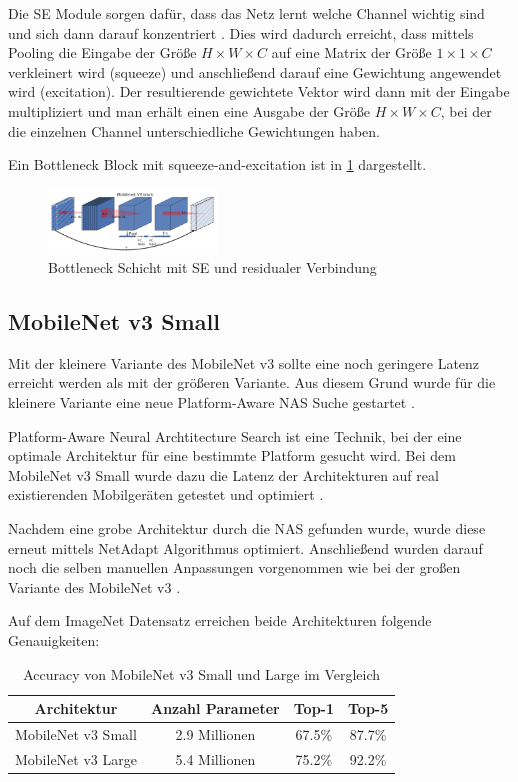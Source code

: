 \documentclass[conference]{IEEEtran}
\begin{document}
Die SE Module sorgen dafür, dass das Netz lernt welche Channel wichtig sind und sich dann darauf konzentriert \cite{b4}. Dies wird dadurch erreicht, dass mittels Pooling die Eingabe der Größe $H \times W \times C$ auf eine Matrix der Größe $1 \times 1 \times C$ verkleinert wird (squeeze) und anschließend darauf eine Gewichtung angewendet wird (excitation). Der resultierende gewichtete Vektor wird dann mit der Eingabe multipliziert und man erhält einen eine Ausgabe der Größe $H \times W \times C$, bei der die einzelnen Channel unterschiedliche Gewichtungen haben.

Ein Bottleneck Block mit squeeze-and-excitation ist in \ref{f2} dargestellt.

\begin{figure}[htbp]
\centerline{\includegraphics[width=0.4\textwidth]{squeeze_and_excitation}}
\caption{Bottleneck Schicht mit SE und residualer Verbindung \cite{b6}}
\label{f2}
\end{figure}

\subsection{MobileNet v3 Small}
Mit der kleinere Variante des MobileNet v3 sollte eine noch geringere Latenz erreicht werden als mit der größeren Variante. Aus diesem Grund wurde für die kleinere Variante eine neue Platform-Aware NAS Suche gestartet \cite{b6}.

Platform-Aware Neural Archtitecture Search ist eine Technik, bei der eine optimale Architektur für eine bestimmte Platform gesucht wird. Bei dem MobileNet v3 Small wurde dazu die Latenz der Architekturen auf real existierenden Mobilgeräten getestet und optimiert \cite{b6}. 

Nachdem eine grobe Architektur durch die NAS gefunden wurde, wurde diese erneut mittels NetAdapt Algorithmus optimiert. Anschließend wurden darauf noch die selben manuellen Anpassungen vorgenommen wie bei der großen Variante des MobileNet v3 \cite{b6}.

Auf dem ImageNet Datensatz \cite{b3} erreichen beide Architekturen folgende Genauigkeiten:

\begin{table}[htbp]
\caption{Accuracy von MobileNet v3 Small und Large im Vergleich \cite{b6}}
\begin{center}
\begin{tabular}{|c|c|c|c|}
\hline
Architektur        & Anzahl Parameter & Top-1 & Top-5  \\
\hline
MobileNet v3 Small & 2.9 Millionen   & 67.5\% & 87.7\% \\
MobileNet v3 Large & 5.4 Millionen   & 75.2\% & 92.2\% \\
\hline
\end{tabular}
\end{center}
\end{table}
\end{document}
